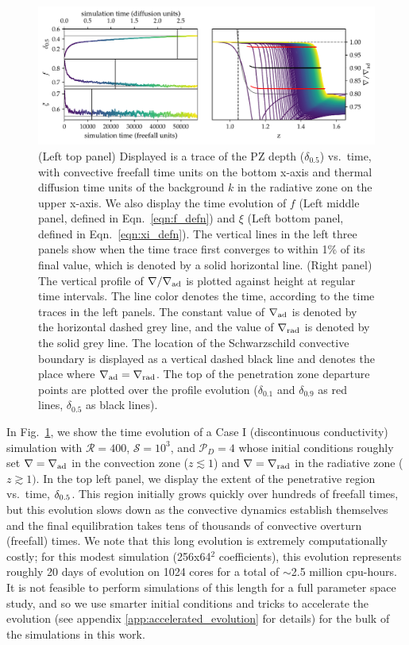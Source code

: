 \documentclass{aastex631}
\newcommand{\gradrad}{\ensuremath{\nabla_{\rm{rad}}}}
\newcommand{\gradad}{\ensuremath{\nabla_{\rm{ad}}}}
\newcommand{\justgrad}{\ensuremath{\nabla}}
\newcommand{\mP}{\ensuremath{\mathcal{P}}}
\newcommand{\mR}{\ensuremath{\mathcal{R}}}
\newcommand{\mS}{\ensuremath{\mathcal{S}}}
\begin{document}
\begin{figure}[t!]
\centering
\includegraphics[width=\textwidth]{time_evolution.pdf}
\caption{
(Left top panel) Displayed is a trace of the PZ depth ($\delta_{0.5}$) vs.~time, with convective freefall time units on the bottom x-axis and thermal diffusion time units of the background $k$ in the radiative zone on the upper x-axis.
We also display the time evolution of $f$ (Left middle panel, defined in Eqn.~\ref{eqn:f_defn}) and $\xi$ (Left bottom panel, defined in Eqn.~\ref{eqn:xi_defn}).
The vertical lines in the left three panels show when the time trace first converges to within 1\% of its final value, which is denoted by a solid horizontal line.
(Right panel) The vertical profile of $\justgrad/\gradad$ is plotted against height at regular time intervals.
The line color denotes the time, according to the time traces in the left panels.
The constant value of $\gradad$ is denoted by the horizontal dashed grey line, and the value of $\gradrad$ is denoted by the solid grey line.
The location of the Schwarzschild convective boundary is displayed as a vertical dashed black line and denotes the place where $\gradad = \gradrad$.
The top of the penetration zone departure points are plotted over the profile evolution ($\delta_{0.1}$ and $\delta_{0.9}$ as red lines, $\delta_{0.5}$ as black lines).
\label{fig:time_evolution}
}
\end{figure}

In Fig.~\ref{fig:time_evolution}, we show the time evolution of a Case I (discontinuous conductivity) simulation with $\mR = 400$, $\mS = 10^3$, and $\mP_D = 4$ whose initial conditions roughly set $\justgrad = \gradad$ in the convection zone ($z \lesssim 1$) and $\justgrad = \gradrad$ in the radiative zone ($z \gtrsim 1)$.
In the top left panel, we display the extent of the penetrative region vs.~time, $\delta_{\rm{0.5}}$.
This region initially grows quickly over hundreds of freefall times, but this evolution slows down as the convective dynamics establish themselves and the final equilibration takes tens of thousands of convective overturn (freefall) times.
We note that this long evolution is extremely computationally costly; for this modest simulation (256x64$^2$ coefficients), this evolution represents roughly 20 days of evolution on 1024 cores for a total of $\sim$2.5 million cpu-hours.
It is not feasible to perform simulations of this length for a full parameter space study, and so we use smarter initial conditions and tricks to accelerate the evolution (see appendix \ref{app:accelerated_evolution} for details) for the bulk of the simulations in this work.
\end{document}
